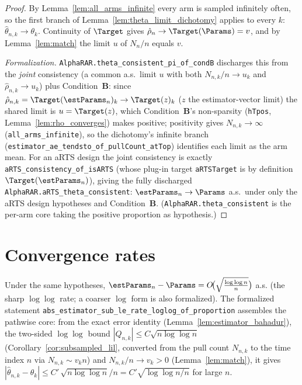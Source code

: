 \begin{proof}\leanok
{}
By Lemma~\ref{lem:all_arms_infinite} every arm is sampled infinitely often, so
the first branch of Lemma~\ref{lem:theta_limit_dichotomy} applies to every $k$:
$\hat{\theta}_{n,k}\to\theta_k$. Continuity of $\Target$ gives
$\hat{\rho}_n\to\Target(\Params)=v$, and by Lemma~\ref{lem:match} the limit $u$ of
$N_n/n$ equals $v$.

\emph{Formalization.} \texttt{AlphaRAR.theta\_consistent\_pi\_of\_condB} discharges this from the
\emph{joint} consistency (a common a.s.\ limit $u$ with both $N_{n,k}/n\to u_k$ and
$\hat\rho_{n,k}\to u_k$) plus Condition~\textbf{B}: since $\hat\rho_{n,k}=\Target(\estParams_n)_k\to
\Target(z)_k$ ($z$ the estimator-vector limit) the shared limit is $u=\Target(z)$, which
Condition~\textbf{B}'s non-sparsity (\texttt{hTpos}, Lemma~\ref{lem:rho_converges}) makes positive;
positivity gives $N_{n,k}\to\infty$ (\texttt{all\_arms\_infinite}), so the dichotomy's infinite branch
(\texttt{estimator\_ae\_tendsto\_of\_pullCount\_atTop}) identifies each limit as the arm mean. For an
aRTS design the joint consistency is exactly \texttt{aRTS\_consistency\_of\_isARTS} (whose plug-in
target \texttt{aRTSTarget} is by definition $\Target(\estParams_n)$), giving the fully discharged
\texttt{AlphaRAR.aRTS\_theta\_consistent}: $\estParams_n\to\Params$ a.s.\ under only the aRTS design
hypotheses and Condition~\textbf{B}. (\texttt{AlphaRAR.theta\_consistent} is the per-arm core taking
the positive proportion as hypothesis.)
\end{proof}

\section{Convergence rates}
\label{sec:cons_rates}

\begin{lemma}\label{lem:theta_LIL}
\leanok
{}
Under the same hypotheses,
$\estParams_n - \Params = O\!\big(\sqrt{\tfrac{\log\log n}{n}}\big)$ a.s. (the sharp $\log\log$ rate;
a coarser $\log$ form is also formalized). The formalized statement
\texttt{abs\_estimator\_sub\_le\_rate\_loglog\_of\_proportion} assembles the pathwise core: from the
exact error identity (Lemma~\ref{lem:estimator_bahadur}), the two-sided $\log\log$ bound
$|Q_{n,k}|\le C\sqrt{n\log\log n}$ (Corollary~\ref{cor:subsampled_lil}, converted from the pull count
$N_{n,k}$ to the time index $n$ via $N_{n,k}\sim v_k n$) and $N_{n,k}/n\to v_k>0$
(Lemma~\ref{lem:match}), it gives $|\hat\theta_{n,k}-\theta_k|\le C'\,\sqrt{n\log\log n}/n =
C'\sqrt{\log\log n/n}$ for large $n$.
\end{lemma}

